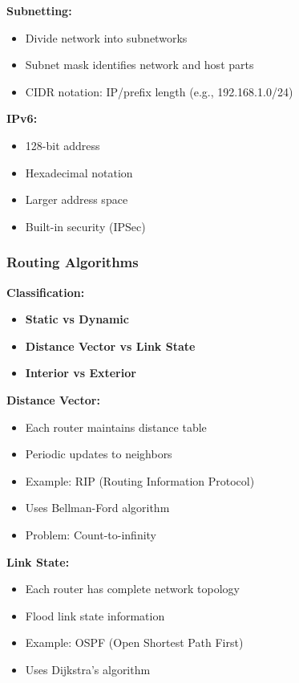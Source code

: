 \documentclass[11pt,a4paper]{article}
\begin{document}
\textbf{Subnetting:}
\begin{itemize}
    \item Divide network into subnetworks
    \item Subnet mask identifies network and host parts
    \item CIDR notation: IP/prefix length (e.g., 192.168.1.0/24)
\end{itemize}

\textbf{IPv6:}
\begin{itemize}
    \item 128-bit address
    \item Hexadecimal notation
    \item Larger address space
    \item Built-in security (IPSec)
\end{itemize}

\subsubsection{Routing Algorithms}

\textbf{Classification:}
\begin{itemize}
    \item \textbf{Static vs Dynamic}
    \item \textbf{Distance Vector vs Link State}
    \item \textbf{Interior vs Exterior}
\end{itemize}

\textbf{Distance Vector:}
\begin{itemize}
    \item Each router maintains distance table
    \item Periodic updates to neighbors
    \item Example: RIP (Routing Information Protocol)
    \item Uses Bellman-Ford algorithm
    \item Problem: Count-to-infinity
\end{itemize}

\textbf{Link State:}
\begin{itemize}
    \item Each router has complete network topology
    \item Flood link state information
    \item Example: OSPF (Open Shortest Path First)
    \item Uses Dijkstra's algorithm
\end{itemize}
\end{document}
